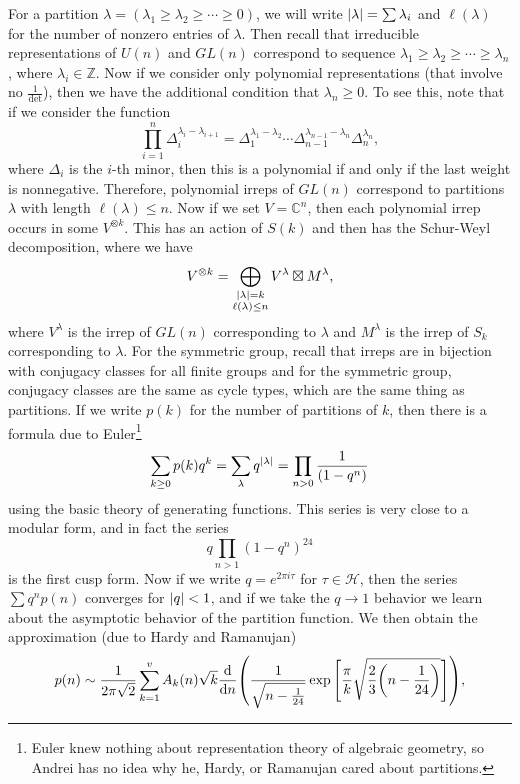 \documentclass[leqno, openany]{memoir}
\theoremstyle{definition}
\theoremstyle{remark}
\theoremstyle{plain}
\theoremstyle{definition}
\theoremstyle{remark}
\newcommand{\C}{\mathbb{C}}
\newcommand{\Z}{\mathbb{Z}}
\newcommand{\mc}[1]{\mathcal{#1}}
\begin{document}
For a partition $\lambda = (\lambda_1 \geq \lambda_2 \geq \cdots \geq 0)$, we will write $\abs{\lambda} = \sum \lambda_i$ and $\ell(\lambda)$ for the number of nonzero entries of $\lambda$. Then recall that irreducible representations of $U(n)$ and $GL(n)$ correspond to sequence $\lambda_1 \geq \lambda_2 \geq \cdots \geq \lambda_n$, where $\lambda_i \in \Z$. Now if we consider only polynomial representations (that involve no $\frac{1}{\det}$), then we have the additional condition that $\lambda_n \geq 0$. To see this, note that if we consider the function
\[ \prod_{i=1}^n \Delta_i^{\lambda_i - \lambda_{i+1}} = \Delta_1^{\lambda_1 - \lambda_2} \cdots \Delta_{n-1}^{\lambda_{n-1} - \lambda_n} \Delta_n^{\lambda_n}, \]
where $\Delta_i$ is the $i$-th minor, then this is a polynomial if and only if the last weight is nonnegative. Therefore, polynomial irreps of $GL(n)$ correspond to partitions $\lambda$ with length $\ell(\lambda) \leq n$. Now if we set $V = \C^n$, then each polynomial irrep occurs in some $V^{\otimes k}$. This has an action of $S(k)$ and then has the Schur-Weyl decomposition, where we have
\[ V^{\otimes k} = \bigoplus_{\substack{\abs{\lambda} = k \\ \ell(\lambda) \leq n}} V^{\lambda} \boxtimes M^{\lambda}, \]
where $V^{\lambda}$ is the irrep of $GL(n)$ corresponding to $\lambda$ and $M^{\lambda}$ is the irrep of $S_k$ corresponding to $\lambda$. For the symmetric group, recall that irreps are in bijection with conjugacy classes for all finite groups and for the symmetric group, conjugacy classes are the same as cycle types, which are the same thing as partitions. If we write $p(k)$ for the number of partitions of $k$, then there is a formula due to Euler\footnote{Euler knew nothing about representation theory of algebraic geometry, so Andrei has no idea why he, Hardy, or Ramanujan cared about partitions.}
\[ \sum_{k\geq 0} p(k) q^k = \sum_{\lambda} q^{\abs{\lambda}} = \prod_{n>0} \dfrac{1}{(1-q^n)} \]
using the basic theory of generating functions. This series is very close to a modular form, and in fact the series
\[ q \prod_{n > 1} (1-q^n)^{24} \]
is the first cusp form. Now if we write $q = e^{2 \pi i \tau}$ for $\tau \in \mc{H}$, then the series $\sum q^n p(n)$ converges for $\abs{q} < 1$, and if we take the $q \to 1$ behavior we learn about the asymptotic behavior of the partition function. We then obtain the approximation (due to Hardy and Ramanujan)
\[ p(n) \sim \frac{1}{2 \pi \sqrt{2}} \sum_{k=1}^v A_k(n) \sqrt{k} \dv{n} \qty(\frac{1}{\sqrt{n - \frac{1}{24}}} \exp \qty[ \frac{\pi}{k} \sqrt{\frac{2}{3} \qty(n - \frac{1}{24})} ]), \]
\end{document}
